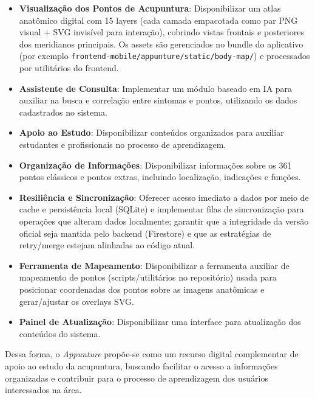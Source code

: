 \begin{itemize}
    \item \textbf{Visualização dos Pontos de Acupuntura}: Disponibilizar um atlas anatômico digital com 15 layers (cada camada empacotada como par PNG visual + SVG invisível para interação), cobrindo vistas frontais e posteriores dos meridianos principais. Os assets são gerenciados no bundle do aplicativo (por exemplo \texttt{frontend-mobile/appunture/static/body-map/}) e processados por utilitários do frontend.
    
    \item \textbf{Assistente de Consulta}: Implementar um módulo baseado em IA para auxiliar na busca e correlação entre sintomas e pontos, utilizando os dados cadastrados no sistema.
    
    \item \textbf{Apoio ao Estudo}: Disponibilizar conteúdos organizados para auxiliar estudantes e profissionais no processo de aprendizagem.
    
    \item \textbf{Organização de Informações}: Disponibilizar informações sobre os 361 pontos clássicos e pontos extras, incluindo localização, indicações e funções.
    
    \item \textbf{Resiliência e Sincronização}: Oferecer acesso imediato a dados por meio de cache e persistência local (SQLite) e implementar filas de sincronização para operações que alteram dados localmente; garantir que a integridade da versão oficial seja mantida pelo backend (Firestore) e que as estratégias de retry/merge estejam alinhadas ao código atual.
    
    \item \textbf{Ferramenta de Mapeamento}: Disponibilizar a ferramenta auxiliar de mapeamento de pontos (scripts/utilitários no repositório) usada para posicionar coordenadas dos pontos sobre as imagens anatômicas e gerar/ajustar os overlays SVG.
    
    \item \textbf{Painel de Atualização}: Disponibilizar uma interface para atualização dos conteúdos do sistema.
\end{itemize}

Dessa forma, o \textit{Appunture} propõe-se como um recurso digital complementar de apoio ao estudo da acupuntura, buscando facilitar o acesso a informações organizadas e contribuir para o processo de aprendizagem dos usuários interessados na área.
